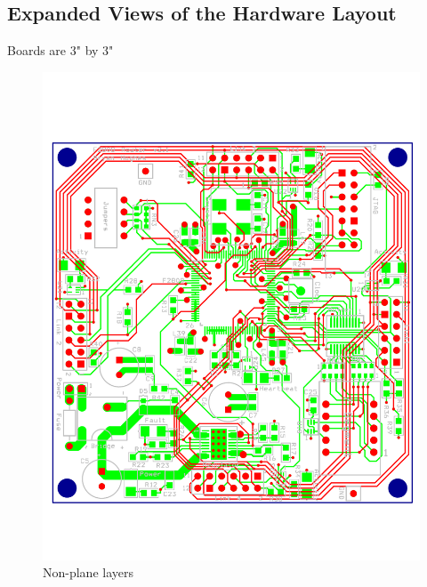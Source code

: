 \begin{appendices}

\pagebreak

\chapter{Expanded Views of the Hardware Layout} \label{sec:appendix:expanded_layout}
Boards are 3" by 3"

\begin{figure}[ptb]
	\begin{centering}
		\includegraphics[width=6in]{Appendices/Figures/appendices-layout_no_power.pdf}
		\caption{Non-plane layers}
		\label{fig:appendices:layout_no_power}
	\end{centering}
\end{figure}


\end{appendices}
